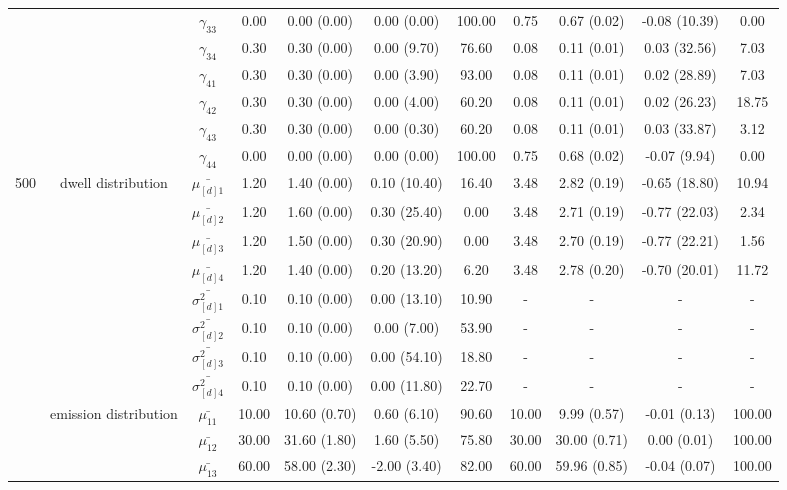 \begin{table}[h]
{\begin{tabular}{ccccccccccc}
 &  & $\gamma_{33}$ & 0.00 & 0.00 (0.00) & 0.00 (0.00) & 100.00 & 0.75 & 0.67 (0.02) & -0.08 (10.39) & 0.00 \\
 &  & $\gamma_{34}$ & 0.30 & 0.30 (0.00) & 0.00 (9.70) & 76.60 & 0.08 & 0.11 (0.01) & 0.03 (32.56) & 7.03 \\
 &  & $\gamma_{41}$ & 0.30 & 0.30 (0.00) & 0.00 (3.90) & 93.00 & 0.08 & 0.11 (0.01) & 0.02 (28.89) & 7.03 \\
 &  & $\gamma_{42}$ & 0.30 & 0.30 (0.00) & 0.00 (4.00) & 60.20 & 0.08 & 0.11 (0.01) & 0.02 (26.23) & 18.75 \\
 &  & $\gamma_{43}$ & 0.30 & 0.30 (0.00) & 0.00 (0.30) & 60.20 & 0.08 & 0.11 (0.01) & 0.03 (33.87) & 3.12 \\
 &  & $\gamma_{44}$ & 0.00 & 0.00 (0.00) & 0.00 (0.00) & 100.00 & 0.75 & 0.68 (0.02) & -0.07 (9.94) & 0.00 \\ \midrule
500 & dwell distribution & $\bar{\mu_{[d]1}}$ & 1.20 & 1.40 (0.00) & 0.10 (10.40) & 16.40 & 3.48 & 2.82 (0.19) & -0.65 (18.80) & 10.94 \\
\multirow{39}{*}{} & \multirow{7}{*}{} & $\bar{\mu_{[d]2}}$ & 1.20 & 1.60 (0.00) & 0.30 (25.40) & 0.00 & 3.48 & 2.71 (0.19) & -0.77 (22.03) & 2.34 \\
 &  & $\bar{\mu_{[d]3}}$ & 1.20 & 1.50 (0.00) & 0.30 (20.90) & 0.00 & 3.48 & 2.70 (0.19) & -0.77 (22.21) & 1.56 \\
 &  & $\bar{\mu_{[d]4}}$ & 1.20 & 1.40 (0.00) & 0.20 (13.20) & 6.20 & 3.48 & 2.78 (0.20) & -0.70 (20.01) & 11.72 \\
 &  & $\bar{\sigma^2_{[d]1}}$ & 0.10 & 0.10 (0.00) & 0.00 (13.10) & 10.90 & - & - & - & - \\
 &  & $\bar{\sigma^2_{[d]2}}$ & 0.10 & 0.10 (0.00) & 0.00 (7.00) & 53.90 & - & - & - & - \\
 &  & $\bar{\sigma^2_{[d]3}}$ & 0.10 & 0.10 (0.00) & 0.00 (54.10) & 18.80 & - & - & - & - \\
 &  & $\bar{\sigma^2_{[d]4}}$ & 0.10 & 0.10 (0.00) & 0.00 (11.80) & 22.70 & - & - & - & - \\
 & emission distribution & $\bar{\mu_{11}}$ & 10.00 & 10.60 (0.70) & 0.60 (6.10) & 90.60 & 10.00 & 9.99 (0.57) & -0.01 (0.13) & 100.00 \\
 & \multirow{15}{*}{} & $\bar{\mu_{12}}$ & 30.00 & 31.60 (1.80) & 1.60 (5.50) & 75.80 & 30.00 & 30.00 (0.71) & 0.00 (0.01) & 100.00 \\
 &  & $\bar{\mu_{13}}$ & 60.00 & 58.00 (2.30) & -2.00 (3.40) & 82.00 & 60.00 & 59.96 (0.85) & -0.04 (0.07) & 100.00 \\

\end{tabular}}
\end{table}
